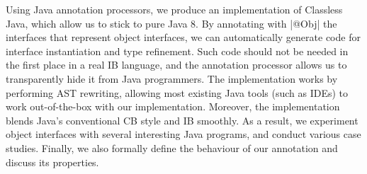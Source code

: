 






Using Java annotation processors, we produce an implementation of
Classless Java, which allow us to stick to pure Java 8. By annotating
with \Q|@Obj| the interfaces that represent object interfaces, we can
automatically generate code for interface instantiation and
type refinement. Such code should not be needed in the first place in
a real IB language, and the annotation processor allows us to
transparently hide it from Java programmers.  The implementation works
by performing AST rewriting, allowing most existing Java tools (such as
IDEs) to work out-of-the-box with our implementation. Moreover, the
implementation blends Java's conventional CB style and IB smoothly.
As a result, we experiment object interfaces with several interesting
Java programs, and conduct various case studies.  Finally, we also
formally define the behaviour of our \mixin annotation and discuss
its properties.



%



